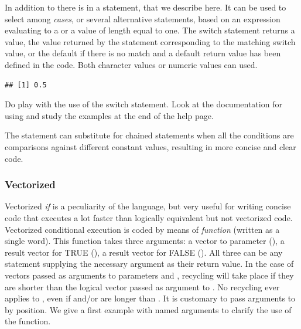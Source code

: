 \documentclass[krantz2]{krantz}\usepackage{knitr}%
\begin{document}
In addition to  there is in  a  statement, that we describe here. It can be used to select among \emph{cases}, or several alternative statements, based on an expression evaluating to a  or a  value of length equal to one. The switch statement returns a value, the value returned by the statement corresponding to the matching switch value, or the default if there is no match and a default return value has been defined in the code. Both character values or numeric values can used.

\begin{knitrout}\footnotesize
{}\color{fgcolor}\begin{kframe}
\begin{alltt}
 \hlkwb{<-} 
 \hlkwb{<-} 
             \hlstd{=} \hlstd{,}
             \hlstd{=}  \hlopt{/} \hlstd{,}
             \hlstd{=}  \hlopt{/} \hlstd{,}
\hlstd{)}
\end{alltt}
\begin{verbatim}
## [1] 0.5
\end{verbatim}
\end{kframe}
\end{knitrout}

\begin{playground}
    Do play with the use of the switch statement. Look at the documentation for  using  and study the examples at the end of the help page.
\end{playground}

The  statement can substitute for chained  statements when all the conditions are comparisons against different constant values, resulting in more concise and clear code.

\subsubsection{Vectorized}
Vectorized \emph{if} is a peculiarity of the \Rlang language, but very useful for writing concise code that executes a lot faster than logically equivalent but not vectorized code.
Vectorized conditional execution is coded by means of \emph{function}  (written as a single word). This function takes three arguments: a  vector to parameter (), a result vector for TRUE (), a result vector for FALSE (). All three can be any \Rlang statement supplying the necessary argument as their return value. In the case of vectors passed as arguments to parameters  and , recycling will take place if they are shorter than the logical vector passed as argument to . No recycling ever applies to , even if  and/or  are longer than . It is customary to pass arguments to  by position. We give a first example with named arguments to clarify the use of the function.
\end{document}
